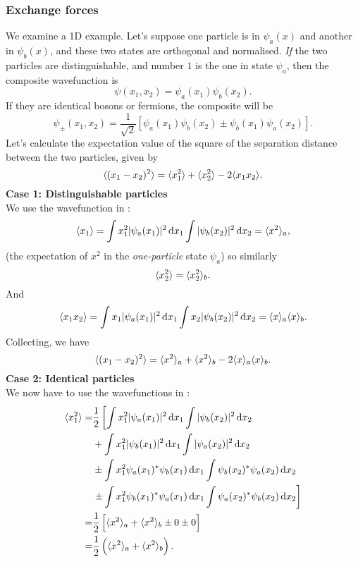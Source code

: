 \subsubsection{Exchange forces}
We examine a 1D example. Let's suppose one particle is in $\psi_a(x)$ and another in $\psi_b(x)$, 
and these two states are orthogonal and normalised. \textit{If} the two particles 
are distinguishable, and number $1$ is the one in state $\psi_a$, then the 
composite wavefunction is 
\begin{equation}
\label{comp_dist}
\psi(x_1,x_2)=\psi_a(x_1)\psi_b(x_2).
\end{equation}
If they are identical bosons or fermions, the composite will be 
\begin{equation}
\label{comp_iden}
\psi_{\pm}(x_1,x_2)=\frac{1}{\sqrt{2}}[\psi_a(x_1)\psi_b(x_2)\pm\psi_b(x_1)\psi_a(x_2)].
\end{equation}
Let's calculate the expectation value of the square of the separation distance 
between the two particles, given by
\begin{equation}
\langle (x_1-x_2)^2\rangle=\langle x_1^2\rangle+\langle x_2^2\rangle-2 \langle x_1x_2\rangle. 
\end{equation}
\textbf{Case 1: Distinguishable particles}\\
We use the wavefunction in :
\begin{equation}
\lgl x_1\rgl=\int x_1^2|\psi_a(x_1)|^2\dx_1\int|\psi_b(x_2)|^2\dx_2=\lgl x^2\rgl_a, 
\end{equation}
(the expectation of $x^2$ in the \textit{one-particle} state $\psi_a$) so similarly 
\begin{equation}
\langle x_2^2\rangle=\langle x_2^2\rangle_b. 
\end{equation}
And
\begin{equation}
\lgl x_1x_2\rgl=\int x_1|\psi_a(x_1)|^2\dx_1\int x_2|\psi_b(x_2)|^2\dx_2=\lgl x\rgl_a \lgl x\rgl_b.
\end{equation}
Collecting, we have
\begin{equation}
\label{delx_dist}
\langle (x_1-x_2)^2\rangle=\langle x^2\rangle_a+\langle x^2\rangle_b-2 \langle x\rangle_a \langle x\rangle_b.
\end{equation}
\textbf{Case 2: Identical particles}\\
We now have to use the wavefunctions in :
\begin{equation}
\begin{aligned}
\lgl x_1^2\rgl=&\frac{1}{2}\lf[\int x_1^2|\psi_a(x_1)|^2\dx_1\int|\psi_b(x_2)|^2\dx_2\rt.\\
&+\int x_1^2|\psi_b(x_1)|^2\dx_1\int|\psi_a(x_2)|^2\dx_2\\
&\pm\int x_1^2\psi_a(x_1)^*\psi_b(x_1)\dx_1\int\psi_b(x_2)^*\psi_a(x_2)\dx_2\\
&\lf.\pm \int x_1^2\psi_b(x_1)^*\psi_a(x_1)\dx_1\int\psi_a(x_2)^*\psi_b(x_2)\dx_2\rt]\\
=&\frac{1}{2}\lf[\lgl x^2\rgl_a+\lgl x^2\rgl_b\pm0\pm0 \rt]\\
=&\frac{1}{2}\lf(\lgl x^2\rgl_a+\lgl x^2\rgl_b\rt).
\end{aligned}
\end{equation}
